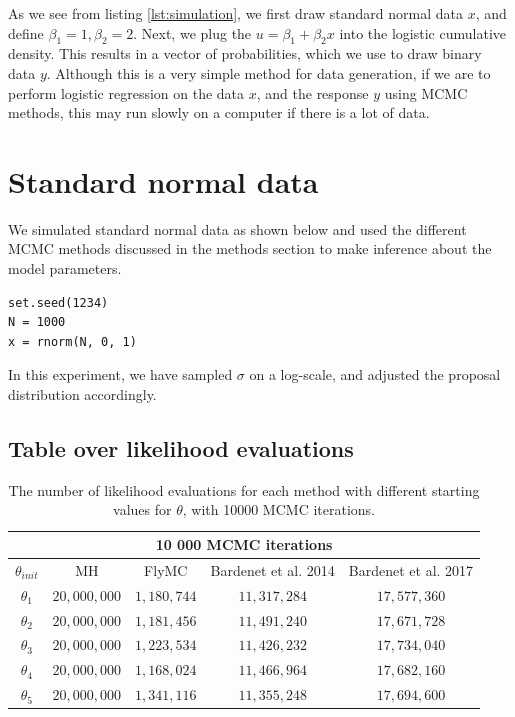 As we see from listing \ref{lst:simulation}, we first draw standard normal data $x$, and define $\beta_1 = 1, \beta_2 = 2$. Next, we plug the  $u = \beta_1 + \beta_2 x$ into the logistic cumulative density. 
This results in a vector of probabilities, which we use to draw binary data $y$. Although this is a very simple method for data generation, if we are to perform logistic regression on the data $x$, and the response $y$ using MCMC methods, this may run slowly on a computer if there is a lot of data.


\section{Standard normal data}
We simulated standard normal data as shown below and used the different MCMC methods discussed in the methods section to make inference about the model parameters. 
\begin{lstlisting}[caption={simulation of standard normal data}, label={lst:sim_normal}]
set.seed(1234)
N = 1000
x = rnorm(N, 0, 1)
\end{lstlisting}
In this experiment, we have sampled $\sigma$ on a log-scale, and adjusted the proposal distribution accordingly. 
\subsection{Table over likelihood evaluations}
\begin{table}
    \centering
\begin{tabular}{|c|c|c|c|c|}
  \hline
    \multicolumn{5}{|c|}{10 000 MCMC iterations} \\
    \hline
\hline
        $\theta_{init}$ &  MH & FlyMC & Bardenet et al. 2014 & Bardenet et al. 2017\\ 
         \hline \hline$\theta_1$ & $20,000,000$ & $1,180,744$ & $11,317,284$ & $17,577,360$ \\
        $\theta_2$ & $20,000,000$ & $1,181,456$ & $11,491,240$ & $17,671,728$ \\
        $\theta_3$ & $20,000,000$ & $1,223,534$ & $11,426,232$ & $17,734,040$
        \\ $ \theta_4$ & $20,000,000$ & $1,168,024$ & $11,466,964$ & $17,682,160$ \\
        $\theta_5$ &$20,000,000$&$1,341,116$&$11,355,248$&$17,694,600$
        \\ \hline
\end{tabular}
\caption{The number of likelihood evaluations for each method with different starting values for $\theta$, with 10000 MCMC iterations.}
\label{tab:ll_evals_10k_normal}
\end{table} 

